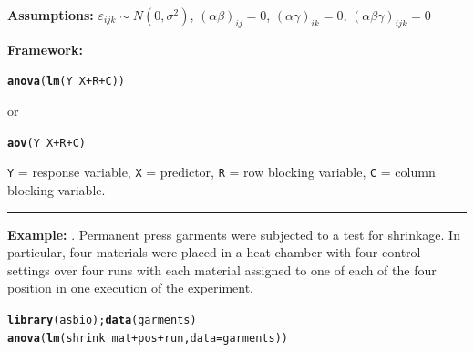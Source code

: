 \documentclass[12pt,english]{article}\usepackage[]{graphicx}\usepackage[table]{xcolor}
\makeatletter
\newcommand{\hlopt}[1]{\textcolor[rgb]{0,0,0}{#1}}%
\newcommand{\hldef}[1]{\textcolor[rgb]{0.345,0.345,0.345}{#1}}%
\newcommand{\hlkwc}[1]{\textcolor[rgb]{0.333,0.667,0.333}{#1}}%
\newcommand{\hlkwd}[1]{\textcolor[rgb]{0.737,0.353,0.396}{\textbf{#1}}}%
\newenvironment{kframe}{%
 \def\at@end@of@kframe{}%
 \ifinner\ifhmode%
  \def\at@end@of@kframe{\end{minipage}}%
  \begin{minipage}{\columnwidth}%
 \fi\fi%
 \def\FrameCommand##1{\hskip\@totalleftmargin \hskip-\fboxsep
 \colorbox{shadecolor}{##1}\hskip-\fboxsep
     \hskip-\linewidth \hskip-\@totalleftmargin \hskip\columnwidth}%
 \MakeFramed {\advance\hsize-\width
   \@totalleftmargin\z@ \linewidth\hsize
   \@setminipage}}%
 {\par\unskip\endMakeFramed%
 \at@end@of@kframe}
\newenvironment{knitrout}{}{} %
\makeatother
\begin{document}
\noindent \textbf{Assumptions:} $\varepsilon_{ijk} \sim N(0, \sigma^2)$, \hspace{0.1in} $(\alpha\beta)_{ij} = 0$, \hspace{0.1in}
$(\alpha\gamma)_{ik} = 0$, \hspace{0.1in} $(\alpha\beta\gamma)_{ijk} = 0$
\vspace{0.1in}

\begin{tcolorbox}[colback=yellow!50!red!25!white,colbacktitle=yellow!50!red,colframe=black!75!white,title=\textbf{R:} LSD]
\textbf{Framework:}\\
\vspace{-.2in}
\begin{knitrout}
\color{fgcolor}\begin{kframe}
\begin{alltt}
\hlkwd{anova}\hldef{(}\hlkwd{lm}\hldef{(Y} \hlopt{~} \hldef{X} \hlopt{+} \hldef{R} \hlopt{+} \hldef{C))}
\end{alltt}
\end{kframe}
\end{knitrout}
\vspace{-.1in}
or
\vspace{-.1in}
\begin{knitrout}
\color{fgcolor}\begin{kframe}
\begin{alltt}
\hlkwd{aov}\hldef{(Y} \hlopt{~} \hldef{X} \hlopt{+} \hldef{R} \hlopt{+} \hldef{C)}
\end{alltt}
\end{kframe}
\end{knitrout}

\texttt{Y} = response variable, \texttt{X} = predictor, \texttt{R} = row blocking variable, \texttt{C} = column blocking variable.
\vspace{0.1in}
\par\noindent\rule{.9\textwidth}{0.4pt}

\textbf{Example:} \citep[][pg 72]{litt2002}.  Permanent press garments were subjected to a test for shrinkage.  In particular, four materials were placed in a heat chamber with four control settings over four runs with each material assigned to one of each of the four position in one execution of the experiment.
\vspace{-.1in}
\begin{knitrout}
\color{fgcolor}\begin{kframe}
\begin{alltt}
\hlkwd{library}\hldef{(asbio);} \hlkwd{data}\hldef{(garments)}
\hlkwd{anova}\hldef{(}\hlkwd{lm}\hldef{(shrink} \hlopt{~} \hldef{mat} \hlopt{+} \hldef{pos} \hlopt{+} \hldef{run,} \hlkwc{data} \hldef{= garments))}
\end{alltt}
\end{kframe}
\end{knitrout}
\end{tcolorbox}
\newpage
\end{document}
